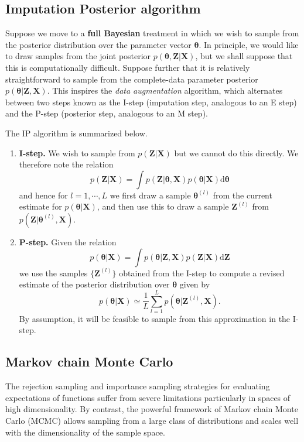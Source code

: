 \documentclass[a4paper]{report}
\newcommand{\ud}{\mathrm{d}}
\renewcommand{\bf}{\mathbf}
\newcommand{\imp}[1]{{\color{blue}\textit{#1}}}
\newcommand{\bs}{\boldsymbol}
\begin{document}
\subsection{Imputation Posterior algorithm}
Suppose we move to a \textbf{full Bayesian} treatment in which we wish to sample from the posterior distribution over the parameter vector $\bs{\theta}$. In principle, we would like to draw samples from the joint posterior $p(\bs{\theta},\bf{Z|X})$, but we shall suppose that this is computationally difficult. Suppose further that it is relatively straightforward to sample from the complete-data parameter posterior $p(\bs{\theta}|\bf{Z,X})$. This inspires the \imp{data augmentation} algorithm, which alternates between two steps known as the I-step (imputation step, analogous to an E step) and the P-step (posterior step, analogous to an M step).

The IP algorithm is summarized below.
\begin{enumerate}
	\item \textbf{I-step.} We wish to sample from $p(\bf{Z|X})$ but we cannot do this directly. We therefore note the relation
	\begin{equation}
		p(\bf{Z|X}) = \int p(\bf{Z}|\bs{\theta},\bf{X})p(\bs{\theta}|\bf{X}) \ud \bs{\theta}
	\end{equation}
	and hence for $l = 1,\cdots,L$ we first draw a sample $\bs{\theta}^{(l)}$ from the current estimate for $p(\bs{\theta}|\bf{X})$, and then use this to draw a sample $\bf{Z}^{(l)}$ from $p(\bf{Z}|\bs{\theta}^{(l)},\bf{X})$.
	\item \textbf{P-step.} Given the relation
	\begin{equation}
		p(\bs{\theta}|\bf{X}) = \int p(\bs{\theta}|\bf{Z,X})p(\bf{Z|X}) \ud \bf{Z}
	\end{equation}
	we use the samples $\{ \bf{Z}^{(l)} \}$ obtained from the I-step to compute a revised estimate of the posterior distribution over $\bs{\theta}$ given by
	\begin{equation}
		p(\bs{\theta}|\bf{X}) \simeq \frac{1}{L} \sum_{l=1}^L p(\bs{\theta}|\bf{Z}^{(l)},\bf{X}).
	\end{equation}
	By assumption, it will be feasible to sample from this approximation in the I-step.
\end{enumerate}
\subsection{Markov chain Monte Carlo}
The rejection sampling and importance sampling strategies for evaluating expectations of functions suffer from severe limitations particularly in spaces of high dimensionality. By contrast, the powerful framework of Markov chain Monte Carlo (MCMC) allows sampling from a large class of distributions and scales well with the dimensionality of the sample space.
\end{document}
